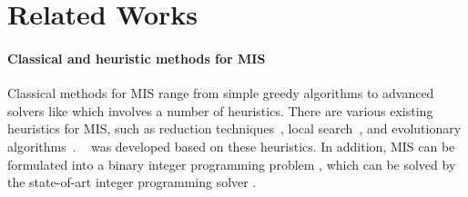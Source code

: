 \section{Related Works}\label{sec:related-works}

\paragraph{Classical and heuristic methods for MIS}



Classical methods for MIS range from simple greedy algorithms to advanced solvers like \kamis which involves a number of heuristics. There are various existing heuristics for MIS, such as reduction techniques~\citep{butenko2002finding, xiao2013confining, akiba2016branch}, local search~\citep{andrade2012fast}, and evolutionary algorithms~\citep{back1994evolutionary, borisovsky2003experimental, lamm2015graph}. \kamis~\citep{lamm2017finding, dahlum2016accelerating, hespe2019scalable} was developed based on these heuristics. In addition, MIS can be formulated into a binary integer programming problem \citep{nemhauser1975vertex}, which can be solved by the state-of-art integer programming solver \gurobi\cite{gurobi}. 

